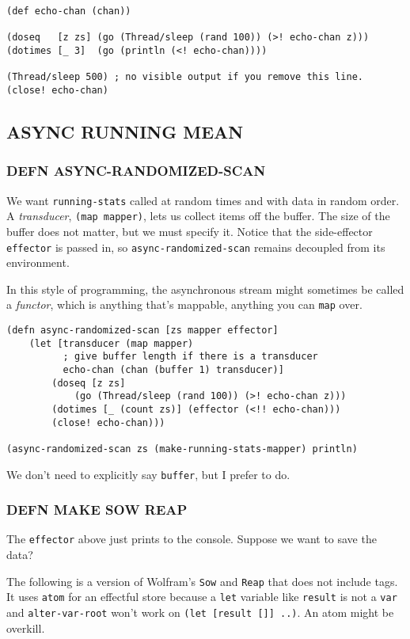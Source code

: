\documentclass[10pt,oneside,x11names]{article}
\begin{document}
\begin{verbatim}
(def echo-chan (chan))

(doseq   [z zs] (go (Thread/sleep (rand 100)) (>! echo-chan z)))
(dotimes [_ 3]  (go (println (<! echo-chan))))

(Thread/sleep 500) ; no visible output if you remove this line.
(close! echo-chan)
\end{verbatim}

\subsection{ASYNC RUNNING MEAN}
\label{async-running-mean}
\subsubsection{DEFN ASYNC-RANDOMIZED-SCAN}
\label{async-randomized-scan}
We want \texttt{running-stats} called at random times and with data in random
order. A \emph{transducer}, \texttt{(map mapper)}, lets us collect items off the
buffer. The size of the buffer does not matter, but we must specify it.
Notice that the side-effector \texttt{effector} is passed in, so
\texttt{async-randomized-scan} remains decoupled from its environment.

In this style of programming, the asynchronous stream might sometimes be
called a \emph{functor}, which is anything that's mappable, anything you can
\texttt{map} over.

\begin{verbatim}
(defn async-randomized-scan [zs mapper effector]
    (let [transducer (map mapper)
          ; give buffer length if there is a transducer
          echo-chan (chan (buffer 1) transducer)]
        (doseq [z zs]
            (go (Thread/sleep (rand 100)) (>! echo-chan z)))
        (dotimes [_ (count zs)] (effector (<!! echo-chan)))
        (close! echo-chan)))

(async-randomized-scan zs (make-running-stats-mapper) println)
\end{verbatim}

We don't need to explicitly say \texttt{buffer}, but I prefer to do.

\subsubsection{DEFN MAKE SOW REAP}
\label{sow-and-reap}
The \texttt{effector} above just prints to the console. Suppose we want to save
the data?

The following is a version of Wolfram's \texttt{Sow} and \texttt{Reap} that does not
include tags. It uses \texttt{atom} for an effectful store because a \texttt{let}
variable like \texttt{result} is not a \texttt{var} and \texttt{alter-var-root} won't work on
\texttt{(let [result []] ..)}. An atom might be overkill.
\end{document}
